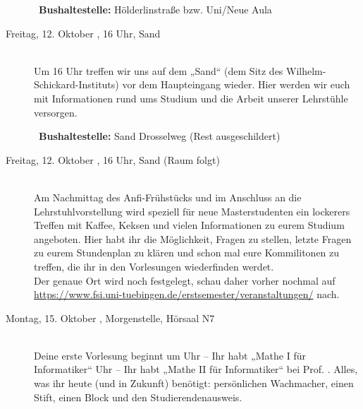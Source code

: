 \begin{description}
~\textbf{Bushaltestelle:} Hölderlinstraße bzw. Uni/Neue Aula
\fi


\item[Freitag, 12. Oktober \Jahr, 16 Uhr, Sand]\ \\
Um 16 Uhr treffen wir uns auf dem „Sand“ (dem Sitz des Wilhelm-Schickard-Instituts) vor dem Haupteingang
wieder. Hier werden wir euch mit Informationen rund ums Studium und die Arbeit unserer Lehrstühle versorgen.

~\textbf{Bushaltestelle:} Sand Drosselweg (Rest ausgeschildert)

\ifmaster
\item[Freitag, 12. Oktober \Jahr, 16 Uhr, Sand (Raum folgt)]\ \\
Am Nachmittag des Anfi-Frühstücks und im Anschluss an die Lehrstuhlvorstellung wird speziell für neue Masterstudenten ein lockerers Treffen mit Kaffee, Keksen und vielen Informationen zu eurem Studium angeboten.
Hier habt ihr die Möglichkeit, Fragen zu stellen, letzte Fragen zu eurem Stundenplan zu klären und schon mal eure Kommilitonen zu treffen, die ihr in den Vorlesungen wiederfinden werdet. \\
Der genaue Ort wird noch festgelegt, schau daher vorher nochmal auf \url{https://www.fsi.uni-tuebingen.de/erstsemester/veranstaltungen/} nach.
\fi

\ifbachelor
\item[Montag, 15. Oktober \Jahr, Morgenstelle, Hörsaal N7]\ \\
Deine erste Vorlesung beginnt um 
 Uhr -- Ihr habt „Mathe I für Informatiker“  \fi
{} Uhr -- Ihr habt „Mathe II für Informatiker“  \fi
bei Prof. \Matheprof.
Alles, was ihr heute (und in Zukunft) benötigt: persönlichen Wachmacher, einen Stift, einen Block und den Studierendenausweis.


\end{description}
